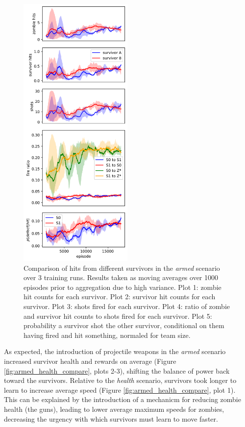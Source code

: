 \documentclass[11pt,a4paper]{article}
\begin{document}
\begin{figure}
  \centering
  \includegraphics[width=0.5\textwidth]{figures/survivor_skill.png}
  \caption{
    Comparison of hits from different survivors in the \emph{armed} scenario over 3 training runs.
    Results taken as moving averages over 1000 episodes prior to aggregation due to high variance.
    Plot 1: zombie hit counts for each survivor.
    Plot 2: survivor hit counts for each survivor.
    Plot 3: shots fired for each survivor.
    Plot 4: ratio of zombie and survivor hit counts to shots fired for each survivor.
    Plot 5: probability a survivor shot the other survivor, conditional on them having fired and hit something, normaled for team size.
  }
  \label{fig:survivor_skill}
\end{figure}

As expected, the introduction of projectile weapons in the \emph{armed} scenario increased survivor health and rewards on average (Figure \ref{fig:armed_health_compare}, plots 2-3),
shifting the balance of power back toward the survivors.
Relative to the \emph{health} scenario, survivors took longer to learn to increase average speed (Figure \ref{fig:armed_health_compare}, plot 1).
This can be explained by the introduction of a mechanicm for reducing zombie health (the guns), leading to lower average maximum speeds for zombies,
decreasing the urgency with which survivors must learn to move faster.
\end{document}
